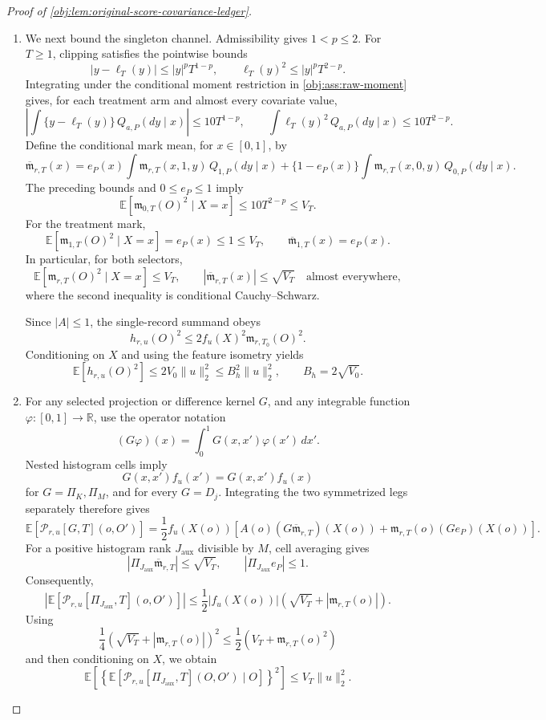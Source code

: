 \begin{proof}[Proof of \cref{obj:lem:original-score-covariance-ledger}]
\begin{enumerate}
\item We next bound the singleton channel. Admissibility gives \(1<p\le2\). For \(T\ge1\), clipping satisfies the pointwise bounds
\[
|y-\ell_T(y)|\le |y|^pT^{1-p},
\qquad
\ell_T(y)^2\le |y|^pT^{2-p}.
\]
Integrating under the conditional moment restriction in \cref{obj:ass:raw-moment} gives, for each treatment arm and almost every covariate value,
\[
\left|
\int\{y-\ell_T(y)\}\,Q_{a,P}(dy\mid x)
\right|
\le10T^{1-p},
\qquad
\int\ell_T(y)^2\,Q_{a,P}(dy\mid x)
\le10T^{2-p}.
\]
Define the conditional mark mean, for \(x\in[0,1]\), by
\[
\overline{\mathfrak m}_{r,T}(x)
=
e_P(x)\int\mathfrak m_{r,T}(x,1,y)\,Q_{1,P}(dy\mid x)
+
\{1-e_P(x)\}
\int\mathfrak m_{r,T}(x,0,y)\,Q_{0,P}(dy\mid x).
\]
The preceding bounds and \(0\le e_P\le1\) imply
\[
\mathbb E[\mathfrak m_{0,T}(O)^2\mid X=x]
\le10T^{2-p}\le V_T.
\]
For the treatment mark,
\[
\mathbb E[\mathfrak m_{1,T}(O)^2\mid X=x]
=e_P(x)\le1\le V_T,
\qquad
\overline{\mathfrak m}_{1,T}(x)=e_P(x).
\]
In particular, for both selectors,
\[
\mathbb E[\mathfrak m_{r,T}(O)^2\mid X=x]\le V_T,
\qquad
|\overline{\mathfrak m}_{r,T}(x)|\le\sqrt{V_T}
\quad\text{almost everywhere},
\]
where the second inequality is conditional Cauchy--Schwarz.

Since \(|A|\le1\), the single-record summand obeys
\[
h_{r,u}(O)^2
\le
2f_u(X)^2\mathfrak m_{r,T_0}(O)^2.
\]
Conditioning on \(X\) and using the feature isometry yields
\[
\mathbb E[h_{r,u}(O)^2]
\le2V_0\|u\|_2^2
\le B_h^2\|u\|_2^2,
\qquad
B_h=2\sqrt{V_0}.
\]

\item For any selected projection or difference kernel \(G\), and any integrable function \(\varphi:[0,1]\to\mathbb R\), use the operator notation
\[
(G\varphi)(x)=\int_0^1G(x,x')\varphi(x')\,dx'.
\]
Nested histogram cells imply
\[
G(x,x')f_u(x')=G(x,x')f_u(x)
\]
for \(G=\Pi_K,\Pi_M\), and for every \(G=D_j\). Integrating the two symmetrized legs separately therefore gives
\[
\mathbb E[\mathscr P_{r,u}[G,T](o,O')]
=
\frac12f_u(X(o))
\left[
A(o)(G\overline{\mathfrak m}_{r,T})(X(o))
+
\mathfrak m_{r,T}(o)(Ge_P)(X(o))
\right].
\]
For a positive histogram rank \(J_{\mathrm{aux}}\) divisible by \(M\), cell averaging gives
\[
|\Pi_{J_{\mathrm{aux}}}\overline{\mathfrak m}_{r,T}|
\le\sqrt{V_T},
\qquad
|\Pi_{J_{\mathrm{aux}}}e_P|\le1.
\]
Consequently,
\[
\left|
\mathbb E[\mathscr P_{r,u}[\Pi_{J_{\mathrm{aux}}},T](o,O')]
\right|
\le
\frac12|f_u(X(o))|
\left(\sqrt{V_T}+|\mathfrak m_{r,T}(o)|\right).
\]
Using
\[
\frac14\left(\sqrt{V_T}+|\mathfrak m_{r,T}(o)|\right)^2
\le
\frac12\left(V_T+\mathfrak m_{r,T}(o)^2\right)
\]
and then conditioning on \(X\), we obtain
\[
\mathbb E\!\left[
\left\{
\mathbb E[\mathscr P_{r,u}[\Pi_{J_{\mathrm{aux}}},T](O,O')\mid O]
\right\}^{\!2}
\right]
\le V_T\|u\|_2^2.
\]


\end{enumerate}
\end{proof}

